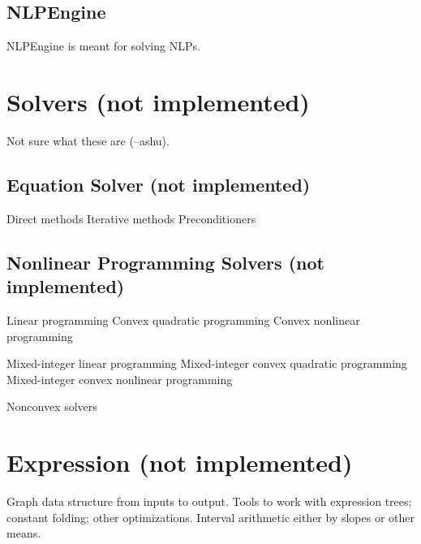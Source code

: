 \documentclass[10pt]{report}
\newcommand{\notimpl}[0]{(not implemented)}
\begin{document}
\subsection{NLPEngine}
NLPEngine is meant for solving NLPs. 


\section{Solvers \notimpl}
Not sure what these are (--ashu).

\subsection{Equation Solver \notimpl}

  Direct methods
  Iterative methods
  Preconditioners

\subsection{Nonlinear Programming Solvers \notimpl}

  Linear programming
  Convex quadratic programming
  Convex nonlinear programming

  Mixed-integer linear programming
  Mixed-integer convex quadratic programming
  Mixed-integer convex nonlinear programming

  Nonconvex solvers

\section{Expression \notimpl}
Graph data structure from inputs to output.  Tools to work with
expression trees; constant folding; other optimizations.  Interval
arithmetic either by slopes or other means.
\end{document}
